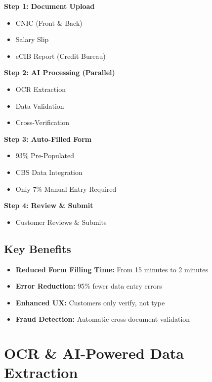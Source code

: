 \documentclass[12pt,a4paper]{article}
\begin{document}
\begin{tcolorbox}[colback=codecolor,colframe=tealcolor,title=Customer Journey Flow]
\textbf{Step 1: Document Upload}
\begin{itemize}[noitemsep]
    \item CNIC (Front \& Back)
    \item Salary Slip
    \item eCIB Report (Credit Bureau)
\end{itemize}

\textbf{Step 2: AI Processing (Parallel)}
\begin{itemize}[noitemsep]
    \item OCR Extraction
    \item Data Validation
    \item Cross-Verification
\end{itemize}

\textbf{Step 3: Auto-Filled Form}
\begin{itemize}[noitemsep]
    \item 93\% Pre-Populated
    \item CBS Data Integration
    \item Only 7\% Manual Entry Required
\end{itemize}

\textbf{Step 4: Review \& Submit}
\begin{itemize}[noitemsep]
    \item Customer Reviews \& Submits
\end{itemize}
\end{tcolorbox}

\subsection{Key Benefits}

\begin{itemize}
    \item \textbf{Reduced Form Filling Time:} From 15 minutes to 2 minutes
    \item \textbf{Error Reduction:} 95\% fewer data entry errors
    \item \textbf{Enhanced UX:} Customers only verify, not type
    \item \textbf{Fraud Detection:} Automatic cross-document validation
\end{itemize}

\newpage

\section{OCR \& AI-Powered Data Extraction}
\end{document}
